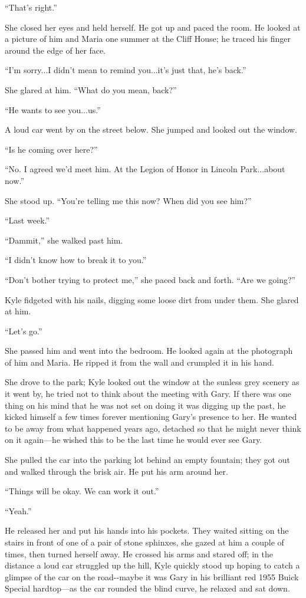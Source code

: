 ``That's right.''

She closed her eyes and held herself. He got up and paced the room. He
looked at a picture of him and Maria one summer at the Cliff House; he
traced his finger around the edge of her face.

``I'm sorry...I didn't mean to remind you...it's just that, he's back.''

She glared at him. ``What do you mean, back?''

``He wants to see you...us.''

A loud car went by on the street below. She jumped and looked out the
window.

``Is he coming over here?''

``No. I agreed we'd meet him. At the Legion of Honor in Lincoln
Park...about now.''

She stood up. ``You're telling me this now? When did you see him?''

``Last week.''

``Dammit,'' she walked past him.

``I didn't know how to break it to you.''

``Don't bother trying to protect me,'' she paced back and forth. ``Are
we going?''

Kyle fidgeted with his nails, digging some loose dirt from under them.
She glared at him.

``Let's go.''

She passed him and went into the bedroom. He looked again at the
photograph of him and Maria. He ripped it from the wall and crumpled it
in his hand.

She drove to the park; Kyle looked out the window at the sunless grey
scenery as it went by, he tried not to think about the meeting with
Gary. If there was one thing on his mind that he was not set on doing it
was digging up the past, he kicked himself a few times forever
mentioning Gary's presence to her. He wanted to be away from what
happened years ago, detached so that he might never think on it
again---he wished this to be the last time he would ever see Gary.

She pulled the car into the parking lot behind an empty fountain; they
got out and walked through the brisk air. He put his arm around her.

``Things will be okay. We can work it out.''

``Yeah.''

He released her and put his hands into his pockets. They waited sitting
on the stairs in front of one of a pair of stone sphinxes, she gazed at
him a couple of times, then turned herself away. He crossed his arms and
stared off; in the distance a loud car struggled up the hill, Kyle
quickly stood up hoping to catch a glimpse of the car on the
road-\/-maybe it was Gary in his brilliant red 1955 Buick Special
hardtop---as the car rounded the blind curve, he relaxed and sat down.

